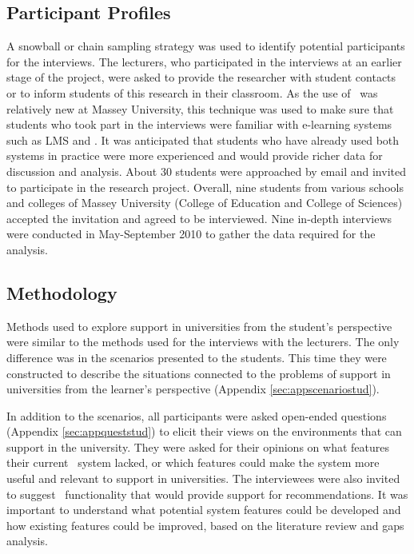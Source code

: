 \subsection{Participant Profiles}

A snowball or chain sampling strategy \citep{Mack2005, Marshall2010} was used to
identify potential participants for the interviews. The lecturers, who 
participated in the interviews at an earlier stage of the project, were asked to
provide the researcher with student contacts or to inform students of this
research in their classroom. As the use of \ep~was relatively new at Massey
University, this technique was used to make sure that students who took part in
the interviews were familiar with e-learning systems such as LMS and \ep. It was
anticipated that students who have already used both systems in practice were
more experienced and would provide richer data for discussion and analysis.
About 30 students were approached by email and invited to participate in the
research project. Overall, nine students from various schools and colleges of
Massey University (College of Education and College of Sciences) accepted the
invitation and agreed to be interviewed. Nine in-depth interviews were conducted
in May-September 2010 to gather the data required for the analysis.

\subsection{Methodology}

Methods used to explore \LLLs support in universities from the student's
perspective were similar to the methods used for the interviews with the
lecturers. The only difference was in the scenarios presented to the students.
This time they were constructed to describe the situations connected to the
problems of \LLLs support in universities from the learner's perspective
(Appendix \ref{sec:appscenariostud}).

In addition to the scenarios, all participants were asked open-ended questions
(Appendix \ref{sec:appqueststud}) to elicit their views on the environments that
can support \LLLs in the university. They were asked for their opinions on what
features their current \ep~system lacked, or which features could make the
system more useful and relevant to \LLLs support in universities. The
interviewees were also invited to suggest \ep~functionality that would provide
support for \LLLs recommendations. It was important to understand what potential
system features could be developed and how existing features could be improved,
based on the literature review and gaps analysis.

